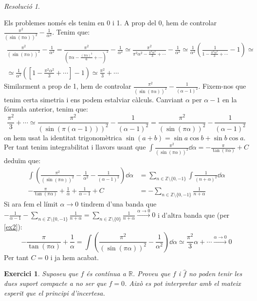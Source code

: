 \documentclass[10pt,a4paper]{article}
\newcommand{\ZZ}{\ensuremath{\mathbb{Z}}} %
\newcommand{\RR}{\ensuremath{\mathbb{R}}} %
\newtheorem{exercici}{Exercici}
\theoremstyle{definition}
\theoremstyle{remark}
\newtheorem*{res}{Resolució}
\begin{document}
\begin{res}
\begin{enumerate}
          Els problemes només els tenim en 0 i 1. A prop del 0, hem de controlar $\frac{\pi^2}{{(\sin(\pi\alpha))}^2}-\frac{1}{\alpha^2}$. Tenim que:
          \begin{multline}\label{ex2}
            \frac{\pi^2}{{(\sin(\pi\alpha))}^2}-\frac{1}{\alpha^2}= \frac{\pi^2}{{(\pi\alpha-\frac{{(\pi\alpha)}^3}{6}+\cdots)}^2}-\frac{1}{\alpha^2}\simeq \frac{\pi^2}{\pi^2\alpha^2-\frac{\pi^4\alpha^4}{3}+\cdots}-\frac{1}{\alpha^2}\simeq \frac{1}{\alpha^2}\left(\frac{1}{1-\frac{\pi^2\alpha^2}{3}+\cdots}-1\right)\simeq \\\simeq \frac{1}{\alpha^2}\left(\left[1-\frac{\pi^2\alpha^2}{3}+\cdots\right]-1\right)\simeq \frac{\pi^2}{3}+\cdots
          \end{multline}
          Similarment a prop de 1, hem de controlar $\frac{\pi^2}{{(\sin(\pi\alpha))}^2}-\frac{1}{{(\alpha-1)}^2}$. Fixem-nos que tenim certa simetria i ens podem estalviar càlculs. Canviant $\alpha$ per $\alpha-1$ en la fórmula anterior, tenim que:
          $$\frac{\pi^2}{3}+\cdots\simeq\frac{\pi^2}{{(\sin(\pi(\alpha-1)))}^2}-\frac{1}{{(\alpha-1)}^2}=\frac{\pi^2}{{(\sin(\pi\alpha))}^2}-\frac{1}{{(\alpha-1)}^2}$$
          on hem usat la identitat trigonomètrica $\sin(a+b)=\sin{a}\cos{b}+\sin{b}\cos{a}$. Per tant tenim integrabilitat i llavors usant que $\int\frac{\pi^2}{{(\sin(\pi\alpha))}^2}\dd{\alpha}=-\frac{\pi}{\tan(\pi\alpha)}+C$ deduïm que:
          \begin{align*}
            \int\left(\frac{\pi^2}{{(\sin(\pi\alpha))}^2}-\frac{1}{\alpha^2}-\frac{1}{{(\alpha-1)^2}}\right)\dd{\alpha} & =\sum_{n\in\ZZ\setminus\{0,-1\}}\int\frac{1}{{(n+\alpha)}^2}\dd{\alpha} \\
            -\frac{\pi}{\tan(\pi\alpha)}+\frac{1}{\alpha}+\frac{1}{\alpha-1}+C                                          & =-\sum_{n\in\ZZ\setminus\{0,-1\}}\frac{1}{n+\alpha}
          \end{align*}
          Si ara fem el límit $\alpha\to0$ tindrem d'una banda que $-\frac{1}{\alpha-1}-\sum_{n\in\ZZ\setminus\{0,-1\}}\frac{1}{n+\alpha}=\sum_{n\in\ZZ\setminus\{0\}}\frac{1}{n+\alpha}\overset{\alpha\to 0}{\longrightarrow}0$ i d'altra banda que (per \eqref{ex2}):
          $$-\frac{\pi}{\tan(\pi\alpha)}+\frac{1}{\alpha}=\int\left(\frac{\pi^2}{{(\sin(\pi\alpha))}^2}-\frac{1}{\alpha^2}\right)\dd{\alpha}\simeq\frac{\pi^2}{3}\alpha+\cdots\overset{\alpha\to 0}{\longrightarrow}0$$
          Per tant $C=0$ i ja hem acabat.
  \end{enumerate}
\end{res}
\begin{exercici}
  Suposeu que $f$ és contínua a $\RR$. Proveu que $f$ i $\widehat{f}$ no poden tenir les dues suport compacte a no ser que $f = 0$. Això es pot interpretar amb el mateix esperit que el principi d'incertesa.
\end{exercici}
\end{document}
